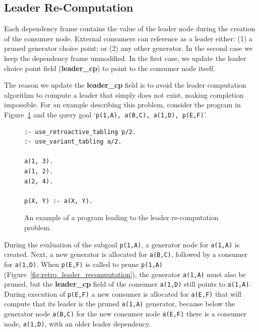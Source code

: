 \subsection{Leader Re-Computation}

Each dependency frame contains the value of the leader node during the creation of the consumer node.
External consumers can reference as a leader either: (1) a pruned generator choice point; or (2) any other generator.
In the second case we keep the dependency frame unmodified. In the first case, we update the leader choice point
field (\textbf{leader\_cp}) to point to the consumer node itself.

The reason we update the \textbf{leader\_cp} field is to avoid the leader computation algorithm to compute
a leader that simply does not exist, making completion impossible.
For an example describing this problem, consider the program in Figure~\ref{fig:retro_leader_program}
and the query goal `\texttt{p(1,A),~a(B,C),~a(1,D),~p(E,F)}'.

\begin{figure}[ht]
\begin{Verbatim}
:- use_retroactive_tabling p/2.
:- use_variant_tabling a/2.

a(1, 3).
a(1, 2).
a(2, 4).

p(X, Y) :- a(X, Y).
\end{Verbatim}
\caption{An example of a program leading to the leader re-computation problem.}
\label{fig:retro_leader_program}
\end{figure}

During the evaluation of the subgoal \texttt{p(1,A)}, a generator node
for \texttt{a(1,A)} is created. Next, a new generator is allocated for \texttt{a(B,C)},
followed by a consumer for \texttt{a(1,D)}. When \texttt{p(E,F)} is called to
prune \texttt{p(1,A)} (Figure~\ref{fig:retro_leader_recomputation}), the generator \texttt{a(1,A)}
must also be pruned, but the \textbf{leader\_cp} field of the consumer \texttt{a(1,D)} still points
to \texttt{a(1,A)}. During execution of \texttt{p(E,F)} a new consumer is allocated for \texttt{a(E,F)} that
will compute that its leader is the pruned \texttt{a(1,A)} generator, because below
the generator node \texttt{a(B,C)} for the new consumer node \texttt{a(E,F)} there is a consumer node,
\texttt{a(1,D)}, with an older leader dependency.

